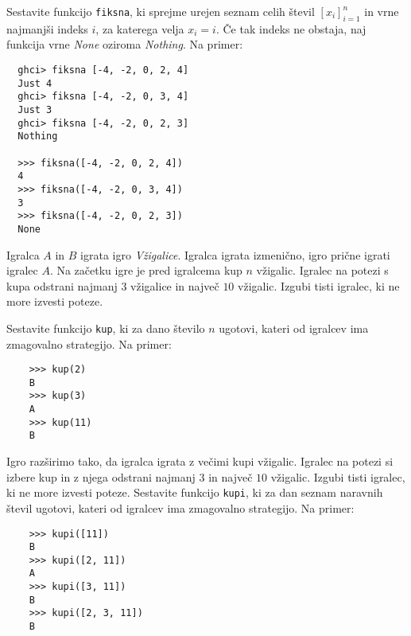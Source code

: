 \documentclass[arhiv]{../izpit}
\begin{document}

  Sestavite funkcijo \texttt{fiksna}, ki sprejme urejen seznam celih števil 
  $[x_i]_{i=1}^n$ in vrne najmanjši indeks $i$, za katerega velja $x_i = i$.
  Če tak indeks ne obstaja, naj funkcija vrne {\sl None} oziroma {\sl Nothing}.
  Na primer:

  \begin{verbatim}
  ghci> fiksna [-4, -2, 0, 2, 4]
  Just 4
  ghci> fiksna [-4, -2, 0, 3, 4]
  Just 3
  ghci> fiksna [-4, -2, 0, 2, 3]
  Nothing

  >>> fiksna([-4, -2, 0, 2, 4])
  4
  >>> fiksna([-4, -2, 0, 3, 4])
  3
  >>> fiksna([-4, -2, 0, 2, 3])
  None
  \end{verbatim}   


  Igralca $A$ in $B$ igrata igro {\em Vžigalice}. Igralca igrata
  izmenično, igro prične igrati igralec $A$. Na začetku igre je pred igralcema
  kup $n$ vžigalic. Igralec na potezi s kupa odstrani najmanj $3$ vžigalice 
  in največ $10$ vžigalic. Izgubi tisti igralec, ki ne more izvesti poteze.

  \podnaloga
    Sestavite funkcijo \texttt{kup}, ki za dano število $n$ ugotovi,
    kateri od igralcev ima zmagovalno strategijo. Na primer:
    \begin{verbatim}
    >>> kup(2)
    B
    >>> kup(3)
    A
    >>> kup(11)
    B
    \end{verbatim}

  \podnaloga 
    Igro razširimo tako, da igralca igrata z večimi kupi vžigalic. Igralec
    na potezi si izbere kup in z njega odstrani najmanj $3$ in največ $10$
    vžigalic. Izgubi tisti igralec, ki ne more izvesti poteze. 
    Sestavite funkcijo \texttt{kupi}, ki za dan seznam naravnih števil
    ugotovi, kateri od igralcev ima zmagovalno strategijo. Na primer:
    \begin{verbatim}
    >>> kupi([11])
    B
    >>> kupi([2, 11])
    A
    >>> kupi([3, 11])
    B
    >>> kupi([2, 3, 11])
    B
    \end{verbatim}
\end{document}

